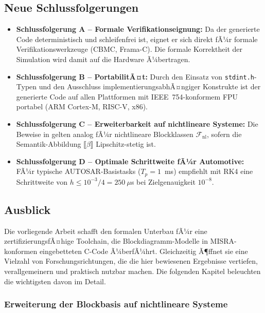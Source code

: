 ﻿\documentclass[12pt,a4paper]{article}
\theoremstyle{definition}
\begin{document}
\subsection{Neue Schlussfolgerungen}

\begin{itemize}
  \item \textbf{Schlussfolgerung A -- Formale Verifikationseignung:}
        Da der generierte Code deterministisch und schleifenfrei ist, eignet er
        sich direkt fÃ¼r formale Verifikationswerkzeuge (CBMC, Frama-C). Die
        formale Korrektheit der Simulation wird damit auf die Hardware
        Ã¼bertragen.

  \item \textbf{Schlussfolgerung B -- PortabilitÃ¤t:}
        Durch den Einsatz von \texttt{stdint.h}-Typen und den Ausschluss
        implementierungsabhÃ¤ngiger Konstrukte ist der generierte Code auf
        allen Plattformen mit IEEE~754-konformem FPU portabel (ARM Cortex-M,
        RISC-V, x86).

  \item \textbf{Schlussfolgerung C -- Erweiterbarkeit auf nichtlineare Systeme:}
        Die Beweise in  gelten analog fÃ¼r
        nichtlineare Blockklassen $\mathcal{F}_{\mathrm{nl}}$, sofern die
        Semantik-Abbildung $\llbracket \beta \rrbracket$ Lipschitz-stetig ist.

  \item \textbf{Schlussfolgerung D -- Optimale Schrittweite fÃ¼r Automotive:}
        FÃ¼r typische AUTOSAR-Basistasks ($T_p = 1$~ms) empfiehlt 
        mit RK4 eine Schrittweite von $h \leq 10^{-3}/4 = 250~\mu$s bei
        Zielgenauigkeit $10^{-8}$.
\end{itemize}

\subsection{Ausblick}

Die vorliegende Arbeit schafft den formalen Unterbau fÃ¼r eine
zertifizierungsfÃ¤hige Toolchain, die Blockdiagramm-Modelle in
MISRA-konformen eingebetteten C-Code Ã¼berfÃ¼hrt. Gleichzeitig Ã¶ffnet sie
eine Vielzahl von Forschungsrichtungen, die die hier bewiesenen Ergebnisse
vertiefen, verallgemeinern und praktisch nutzbar machen. Die folgenden
Kapitel beleuchten die wichtigsten davon im Detail.

\subsubsection{Erweiterung der Blockbasis auf nichtlineare Systeme}
\end{document}
